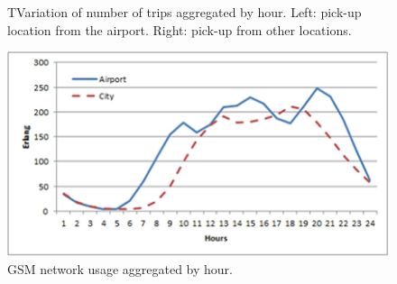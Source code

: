 \documentclass[a4paper, 10pt, conference]{ieeeconf}      %
\begin{document}
\begin{figure}[ht]
    \centering
    \caption{ TVariation of number of trips aggregated by hour. Left:  pick-up location from the airport. Right: pick-up from other locations. }
    \label{fig:my_png_7}
\end{figure}

\begin{figure}[ht]
    \centering
    \includegraphics{fig/png8.png}
    \caption{GSM network usage aggregated by hour. }
    \label{fig:my_png_8}
\end{figure}

\end{document}
